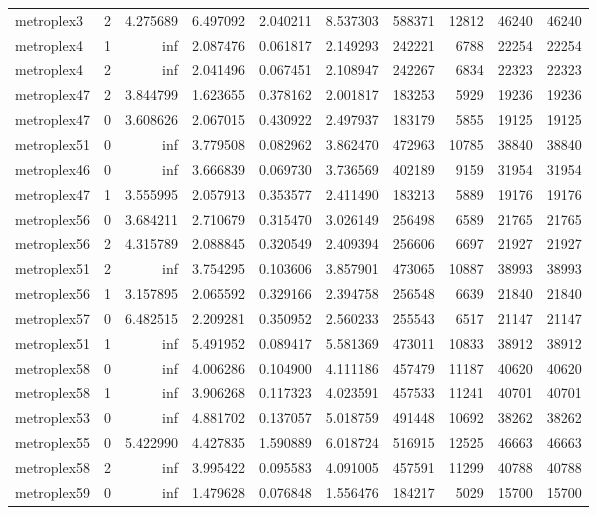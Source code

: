 \begin{longtable}{|l|r|r|r|r|r|r|r|r|r|}
metroplex3 & 2 & 4.275689 & 6.497092 & 2.040211 & 8.537303 & 588371 & 12812 & 46240 & 46240 \\
metroplex4 & 1 & inf & 2.087476 & 0.061817 & 2.149293 & 242221 & 6788 & 22254 & 22254 \\
metroplex4 & 2 & inf & 2.041496 & 0.067451 & 2.108947 & 242267 & 6834 & 22323 & 22323 \\
metroplex47 & 2 & 3.844799 & 1.623655 & 0.378162 & 2.001817 & 183253 & 5929 & 19236 & 19236 \\
metroplex47 & 0 & 3.608626 & 2.067015 & 0.430922 & 2.497937 & 183179 & 5855 & 19125 & 19125 \\
metroplex51 & 0 & inf & 3.779508 & 0.082962 & 3.862470 & 472963 & 10785 & 38840 & 38840 \\
metroplex46 & 0 & inf & 3.666839 & 0.069730 & 3.736569 & 402189 & 9159 & 31954 & 31954 \\
metroplex47 & 1 & 3.555995 & 2.057913 & 0.353577 & 2.411490 & 183213 & 5889 & 19176 & 19176 \\
metroplex56 & 0 & 3.684211 & 2.710679 & 0.315470 & 3.026149 & 256498 & 6589 & 21765 & 21765 \\
metroplex56 & 2 & 4.315789 & 2.088845 & 0.320549 & 2.409394 & 256606 & 6697 & 21927 & 21927 \\
metroplex51 & 2 & inf & 3.754295 & 0.103606 & 3.857901 & 473065 & 10887 & 38993 & 38993 \\
metroplex56 & 1 & 3.157895 & 2.065592 & 0.329166 & 2.394758 & 256548 & 6639 & 21840 & 21840 \\
metroplex57 & 0 & 6.482515 & 2.209281 & 0.350952 & 2.560233 & 255543 & 6517 & 21147 & 21147 \\
metroplex51 & 1 & inf & 5.491952 & 0.089417 & 5.581369 & 473011 & 10833 & 38912 & 38912 \\
metroplex58 & 0 & inf & 4.006286 & 0.104900 & 4.111186 & 457479 & 11187 & 40620 & 40620 \\
metroplex58 & 1 & inf & 3.906268 & 0.117323 & 4.023591 & 457533 & 11241 & 40701 & 40701 \\
metroplex53 & 0 & inf & 4.881702 & 0.137057 & 5.018759 & 491448 & 10692 & 38262 & 38262 \\
metroplex55 & 0 & 5.422990 & 4.427835 & 1.590889 & 6.018724 & 516915 & 12525 & 46663 & 46663 \\
metroplex58 & 2 & inf & 3.995422 & 0.095583 & 4.091005 & 457591 & 11299 & 40788 & 40788 \\
metroplex59 & 0 & inf & 1.479628 & 0.076848 & 1.556476 & 184217 & 5029 & 15700 & 15700 \\

\end{longtable}

